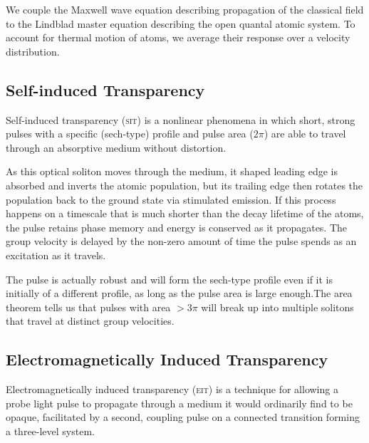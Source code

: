     We couple the Maxwell wave equation describing propagation of the classical
    field to the Lindblad master equation describing the open quantal atomic
    system. To account for thermal motion of atoms, we average their response
    over a velocity distribution.\cite{foot2005atomic}


  \subsection*{Self-induced Transparency}

    Self-induced transparency (\textsc{sit}) is a nonlinear phenomena in which
    short, strong pulses with a specific (sech-type) profile and pulse area
    ($2\pi$) are able to travel through an absorptive medium without
    distortion.\cite{McCall1969}

    As this optical soliton moves through the medium, it shaped leading edge is
    absorbed and inverts the atomic population, but its trailing edge then
    rotates the population back to the ground state via stimulated
    emission.\cite{allen1975optical} If this process happens on a timescale that
    is much shorter than the decay lifetime of the atoms, the pulse retains
    phase memory and energy is conserved as it propagates. The group velocity is
    delayed by the non-zero amount of time the pulse spends as an excitation as
    it travels.

    The pulse is actually robust and will form the sech-type profile even if it
    is initially of a different profile, as long as the pulse area is large
    enough.The area theorem\cite{McCall1969} tells us that pulses with area $>
    3\pi$ will break up into multiple solitons that travel at distinct group
    velocities.\cite{Slusher1972}

  \subsection*{Electromagnetically Induced Transparency}

    Electromagnetically induced transparency (\textsc{eit}) is a technique for
    allowing a probe light pulse to propagate through a medium it would
    ordinarily find to be opaque, facilitated by a second, coupling pulse on a
    connected transition forming a three-level system.\cite{Fleischhauer2005,Harris1997,Harris1990}


